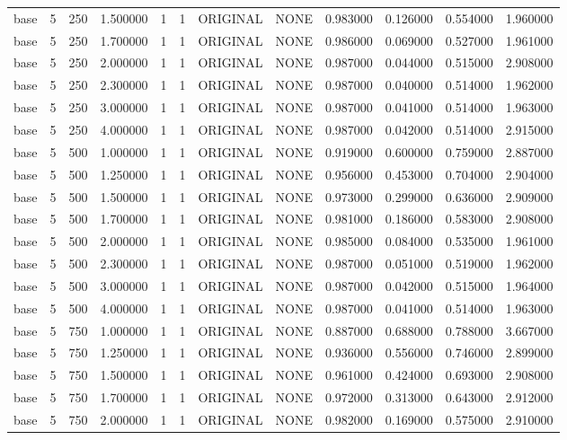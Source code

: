 \begin{tabular}{lrrrllllrrrr}
base & 5 & 250 & 1.500000 & 1 & 1 & ORIGINAL & NONE & 0.983000 & 0.126000 & 0.554000 & 1.960000 \\
base & 5 & 250 & 1.700000 & 1 & 1 & ORIGINAL & NONE & 0.986000 & 0.069000 & 0.527000 & 1.961000 \\
base & 5 & 250 & 2.000000 & 1 & 1 & ORIGINAL & NONE & 0.987000 & 0.044000 & 0.515000 & 2.908000 \\
base & 5 & 250 & 2.300000 & 1 & 1 & ORIGINAL & NONE & 0.987000 & 0.040000 & 0.514000 & 1.962000 \\
base & 5 & 250 & 3.000000 & 1 & 1 & ORIGINAL & NONE & 0.987000 & 0.041000 & 0.514000 & 1.963000 \\
base & 5 & 250 & 4.000000 & 1 & 1 & ORIGINAL & NONE & 0.987000 & 0.042000 & 0.514000 & 2.915000 \\
base & 5 & 500 & 1.000000 & 1 & 1 & ORIGINAL & NONE & 0.919000 & 0.600000 & 0.759000 & 2.887000 \\
base & 5 & 500 & 1.250000 & 1 & 1 & ORIGINAL & NONE & 0.956000 & 0.453000 & 0.704000 & 2.904000 \\
base & 5 & 500 & 1.500000 & 1 & 1 & ORIGINAL & NONE & 0.973000 & 0.299000 & 0.636000 & 2.909000 \\
base & 5 & 500 & 1.700000 & 1 & 1 & ORIGINAL & NONE & 0.981000 & 0.186000 & 0.583000 & 2.908000 \\
base & 5 & 500 & 2.000000 & 1 & 1 & ORIGINAL & NONE & 0.985000 & 0.084000 & 0.535000 & 1.961000 \\
base & 5 & 500 & 2.300000 & 1 & 1 & ORIGINAL & NONE & 0.987000 & 0.051000 & 0.519000 & 1.962000 \\
base & 5 & 500 & 3.000000 & 1 & 1 & ORIGINAL & NONE & 0.987000 & 0.042000 & 0.515000 & 1.964000 \\
base & 5 & 500 & 4.000000 & 1 & 1 & ORIGINAL & NONE & 0.987000 & 0.041000 & 0.514000 & 1.963000 \\
base & 5 & 750 & 1.000000 & 1 & 1 & ORIGINAL & NONE & 0.887000 & 0.688000 & 0.788000 & 3.667000 \\
base & 5 & 750 & 1.250000 & 1 & 1 & ORIGINAL & NONE & 0.936000 & 0.556000 & 0.746000 & 2.899000 \\
base & 5 & 750 & 1.500000 & 1 & 1 & ORIGINAL & NONE & 0.961000 & 0.424000 & 0.693000 & 2.908000 \\
base & 5 & 750 & 1.700000 & 1 & 1 & ORIGINAL & NONE & 0.972000 & 0.313000 & 0.643000 & 2.912000 \\
base & 5 & 750 & 2.000000 & 1 & 1 & ORIGINAL & NONE & 0.982000 & 0.169000 & 0.575000 & 2.910000 \\

\end{tabular}
